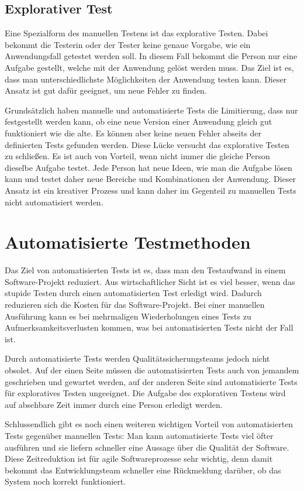 \subsection{Explorativer Test}

Eine Spezialform des manuellen Testens ist das explorative Testen. Dabei bekommt die Testerin oder der Tester keine genaue Vorgabe, wie ein Anwendungsfall getestet werden soll. In diesem Fall bekommt die Person nur eine Aufgabe gestellt, welche mit der Anwendung gelöst werden muss. Das Ziel ist es, dass man unterschiedlichste Möglichkeiten der Anwendung testen kann. Dieser Ansatz ist gut dafür geeignet, um neue Fehler zu finden. 

\SuperPar
Grundsätzlich haben manuelle und automatisierte Tests die Limitierung, dass nur festgestellt werden kann, ob eine neue Version einer Anwendung gleich gut funktioniert wie die alte. Es können aber keine neuen Fehler abseits der definierten Tests gefunden werden. Diese Lücke versucht das explorative Testen zu schließen. Es ist auch von Vorteil, wenn nicht immer die gleiche Person dieselbe Aufgabe testet. Jede Person hat neue Ideen, wie man die Aufgabe lösen kann und testet daher neue Bereiche und Kombinationen der Anwendung. Dieser Ansatz ist ein kreativer Prozess und kann daher im Gegenteil zu manuellen Tests nicht automatisiert werden.

\section{Automatisierte Testmethoden}

Das Ziel von automatisierten Tests ist es, dass man den Testaufwand in einem Software-Projekt reduziert. Aus wirtschaftlicher Sicht ist es viel besser, wenn das stupide Testen durch einen automatisierten Test erledigt wird. Dadurch reduzieren sich die Kosten für das Software-Projekt. Bei einer manuellen Ausführung kann es bei mehrmaligen Wiederholungen eines Tests zu Aufmerksamkeitsverlusten kommen, was bei automatisierten Tests nicht der Fall ist.

\SuperPar
Durch automatisierte Tests werden Qualitätssicherungsteams jedoch nicht obsolet. Auf der einen Seite müssen die automatisierten Tests auch von jemandem geschrieben und gewartet werden, auf der anderen Seite sind automatisierte Tests für exploratives Testen ungeeignet. Die Aufgabe des explorativen Testens wird auf absehbare Zeit immer durch eine Person erledigt werden.

\SuperPar
Schlussendlich gibt es noch einen weiteren wichtigen Vorteil von automatisierten Tests gegenüber manuellen Tests: Man kann automatisierte Tests viel öfter ausführen und sie liefern schneller eine Aussage über die Qualität der Software. Diese Zeitreduktion ist für agile Softwareprozesse sehr wichtig, denn damit bekommt das Entwicklungsteam schneller eine Rückmeldung darüber, ob das System noch korrekt funktioniert. 


